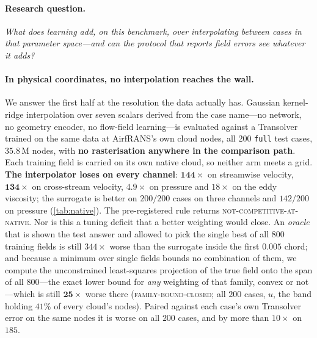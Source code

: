 \paragraph{Research question.} \emph{What does learning add, on this benchmark, over
interpolating between cases in that parameter space---and can the protocol that reports
field errors see whatever it adds?}

\paragraph{In physical coordinates, no interpolation reaches the wall.} We answer the first
half at the resolution the data actually has. Gaussian
kernel-ridge interpolation over seven scalars derived from the case name---no network, no
geometry encoder, no flow-field learning---is evaluated against a Transolver trained on the
same data at AirfRANS's own cloud nodes, all $200$ \texttt{full} test cases, $35.8$\,M nodes, with
\textbf{no rasterisation anywhere in the comparison path}. Each training field is carried
on its own native cloud, so neither arm meets a grid. \textbf{The interpolator loses on
every channel}: $\mathbf{144\times}$ on streamwise velocity, $\mathbf{134\times}$ on
cross-stream velocity, $\mathbf{4.9\times}$ on pressure and $18\times$ on the eddy
viscosity; the surrogate is better on
$200/200$ cases on three channels and $142/200$ on pressure (\autoref{tab:native}). The
pre-registered rule returns \textsc{not-competitive-at-native}. Nor is this a tuning
deficit that a better weighting would close. An \emph{oracle} that is shown the test answer
and allowed to pick the single best of all $800$ training fields is still $344\times$
worse than the surrogate inside the first $0.005$ chord; and because a minimum over single
fields bounds no combination of them, we compute the unconstrained least-squares
projection of the true field onto the span of all $800$---the exact lower bound for
\emph{any} weighting of that family, convex or not---which is still $\mathbf{25\times}$
worse there (\textsc{family-bound-closed}; all $200$ cases, $u$, the band holding $41\%$ of
every cloud's nodes). Paired against each case's own Transolver error on the same nodes it
is worse on all $200$ cases, and by more than $10\times$ on $185$.

